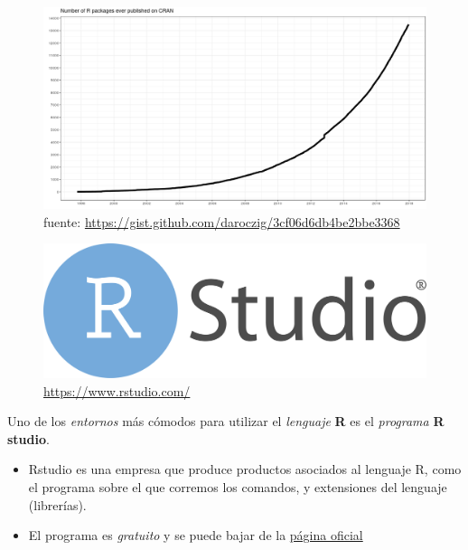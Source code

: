 \documentclass[]{book}
\begin{document}
\begin{figure}
\centering
\includegraphics[width=10.41667in,height=\textheight]{img/number-of-submitted-packages-to-CRAN.png}
\caption{fuente: \url{https://gist.github.com/daroczig/3cf06d6db4be2bbe3368}}
\end{figure}

\begin{figure}
\centering
\includegraphics[width=10.41667in,height=\textheight]{img/RStudio-Logo-Flat.png}
\caption{\url{https://www.rstudio.com/}}
\end{figure}

Uno de los \emph{entornos} más cómodos para utilizar el \emph{lenguaje} \textbf{R} es el \emph{programa} \textbf{R studio}.

\begin{itemize}
\item
  Rstudio es una empresa que produce productos asociados al lenguaje R, como el programa sobre el que corremos los comandos, y extensiones del lenguaje (librerías).
\item
  El programa es \emph{gratuito} y se puede bajar de la
  \href{https://www.rstudio.com/}{página oficial}
\end{itemize}
\end{document}
